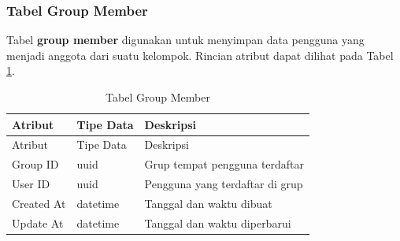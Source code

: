 \subsubsection{Tabel Group Member}
\par Tabel \textbf{group member} digunakan untuk menyimpan data pengguna yang menjadi anggota dari suatu kelompok. Rincian atribut dapat dilihat pada Tabel \ref{tabel_group_member}.
\begin{longtable}{|p{2cm}|p{2.5cm}|p{4.5cm}|}
	\caption{Tabel Group Member} \label{tabel_group_member} \\ \hline
    \rowcolor{lightgray} {Atribut} & {Tipe Data} & {Deskripsi} \\ \hline
    \endfirsthead
    \hline
    \rowcolor{lightgray} {Atribut} & {Tipe Data} & {Deskripsi} \\ \hline
    \endhead
    Group ID & uuid & Grup tempat pengguna terdaftar \\ \hline
    User ID & uuid & Pengguna yang terdaftar di grup \\ \hline
    Created At & datetime & Tanggal dan waktu dibuat \\ \hline
    Update At & datetime & Tanggal dan waktu diperbarui \\ \hline
\end{longtable}

